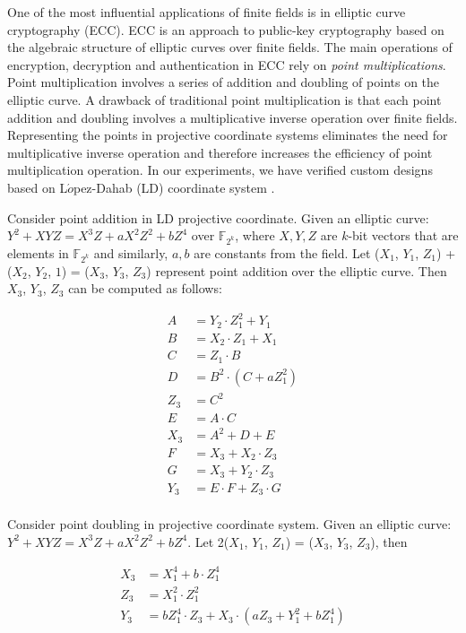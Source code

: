 One of the most influential applications of finite fields is in elliptic curve cryptography (ECC).
ECC is an approach to public-key cryptography based on the algebraic structure of elliptic curves over finite fields.
The main operations of encryption, decryption and authentication in ECC rely on {\it point multiplications}.
Point multiplication involves a series of addition and doubling of points on the elliptic curve. %
A drawback of traditional point multiplication is that each point addition and doubling 
involves a multiplicative inverse operation over finite fields.
Representing the points in projective coordinate systems \cite{ecc:software}
eliminates the need for multiplicative inverse operation and therefore increases the efficiency of point multiplication operation.
In our experiments, we have verified custom designs based on L$\acute{o}$pez-Dahab (LD) coordinate system \cite{eccld}. 

\begin{Example}
Consider point addition in LD projective coordinate. Given an elliptic curve: $Y^2 + XYZ = X^3Z + aX^2Z^2 + bZ^4$ over $\mathbb{F}_{2^k}$, 
where $X,Y,Z$ are $k$-bit vectors
that are elements in $\mathbb{F}_{2^k}$ and similarly, $a, b$ are constants from the field. 
Let ($X_1$, $Y_1$, $Z_1$) + ($X_2$, $Y_2$, $1$) = ($X_3$, $Y_3$, $Z_3$) represent point addition over the elliptic curve.
Then $X_3$, $Y_3$, $Z_3$ can be computed as follows:

\begin{align*}
A &= Y_2 \cdot Z_1^2 + Y_1 \\
B &= X_2 \cdot Z_1 + X_1 \\
C &= Z_1 \cdot B \\
D &= B^2 \cdot(C + a Z_1^2) \\
Z_3 &= C^2 \\
E &= A \cdot C  \\
X_3 &= A^2 + D + E  \\
F &= X_3 + X_2 \cdot Z_3 \\
G &= X_3 + Y_2\cdot Z_3 \\
Y_3 &= E\cdot F + Z_3 \cdot G \\
\end{align*}
\end{Example}

\begin{Example}
Consider point doubling in projective coordinate system. Given an elliptic curve: $Y^2 + XYZ = X^3Z + aX^2Z^2 + bZ^4$. 
Let 2($X_1$, $Y_1$, $Z_1$) = ($X_3$, $Y_3$, $Z_3$), then

\begin{align*}
X_3 &= X_1^4 + b \cdot Z_1^4  \\
Z_3 &= X_1^2 \cdot Z_1^2 \\
Y_3 &= b Z_1^4 \cdot Z_3 + X_3 \cdot (aZ_3 + Y_1^2 + bZ_1^4 ) \\
\end{align*}
\end{Example}



